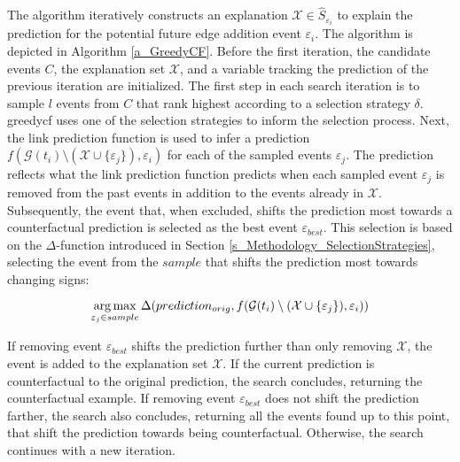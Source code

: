 The algorithm iteratively constructs an explanation $\mathcal{X} \in \hat{S}_{\varepsilon_i}$ to explain the prediction for the potential future edge addition event $\varepsilon_i$. The algorithm is depicted in Algorithm \ref{a_GreedyCF}. Before the first iteration, the candidate events $C$, the explanation set $\mathcal{X}$, and a variable tracking the prediction of the previous iteration are initialized. The first step in each search iteration is to sample $l$ events from $C$ that rank highest according to a selection strategy $\delta$. \gls{greedycf} uses one of the selection strategies to inform the selection process. Next, the link prediction function is used to infer a prediction $f(\mathcal{G}(t_i) \setminus (\mathcal{X} \cup \{\varepsilon_j\}), \varepsilon_i)$ for each of the sampled events $\varepsilon_j$. The prediction reflects what the link prediction function predicts when each sampled event $\varepsilon_j$ is removed from the past events in addition to the events already in $\mathcal{X}$. Subsequently, the event that, when excluded, shifts the prediction most towards a counterfactual prediction is selected as the best event $\varepsilon_{best}$. This selection is based on the $\Delta$-function introduced in Section \ref{s_Methodology_SelectionStrategies}, selecting the event from the $sample$ that shifts the prediction most towards changing signs:

\begin{equation}
    \operatorname*{arg\,max}_{\varepsilon_j \in sample} \Delta(prediction_{orig}, f(\mathcal{G}(t_i) \setminus (\mathcal{X} \cup \{\varepsilon_j\}), \varepsilon_i))
\end{equation}

If removing event $\varepsilon_{best}$ shifts the prediction further than only removing $\mathcal{X}$, the event is added to the explanation set $\mathcal{X}$. If the current prediction is counterfactual to the original prediction, the search concludes, returning the counterfactual example. If removing event $\varepsilon_{best}$ does not shift the prediction farther, the search also concludes, returning all the events found up to this point, that shift the prediction towards being counterfactual. Otherwise, the search continues with a new iteration.

